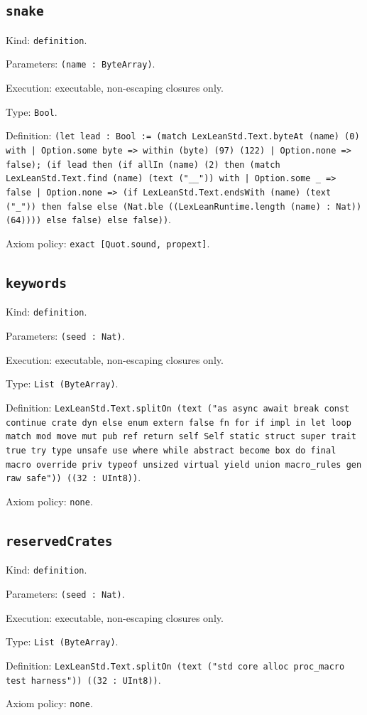 \documentclass[11pt]{article}
\begin{document}
\subsection*{\texttt{snake}}
\noindent Kind: \texttt{definition}.\par
\noindent Parameters: \texttt{(name : ByteArray)}.\par
\noindent Execution: executable, non-escaping closures only.\par
\noindent Type: \texttt{Bool}.\par
\noindent Definition: \texttt{(let lead : Bool := (match LexLeanStd.Text.byteAt (name) (0) with | Option.some byte => within (byte) (97) (122) | Option.none => false); (if lead then (if allIn (name) (2) then (match LexLeanStd.Text.find (name) (text ("\_\_")) with | Option.some \_ => false | Option.none => (if LexLeanStd.Text.endsWith (name) (text ("\_")) then false else (Nat.ble ((LexLeanRuntime.length (name) : Nat)) (64)))) else false) else false))}.\par
\noindent Axiom policy: \texttt{exact [Quot.sound, propext]}.\par
\subsection*{\texttt{keywords}}
\noindent Kind: \texttt{definition}.\par
\noindent Parameters: \texttt{(seed : Nat)}.\par
\noindent Execution: executable, non-escaping closures only.\par
\noindent Type: \texttt{List (ByteArray)}.\par
\noindent Definition: \texttt{LexLeanStd.Text.splitOn (text ("as async await break const continue crate dyn else enum extern false fn for if impl in let loop match mod move mut pub ref return self Self static struct super trait true try type unsafe use where while abstract become box do final macro override priv typeof unsized virtual yield union macro\_rules gen raw safe")) ((32 : UInt8))}.\par
\noindent Axiom policy: \texttt{none}.\par
\subsection*{\texttt{reservedCrates}}
\noindent Kind: \texttt{definition}.\par
\noindent Parameters: \texttt{(seed : Nat)}.\par
\noindent Execution: executable, non-escaping closures only.\par
\noindent Type: \texttt{List (ByteArray)}.\par
\noindent Definition: \texttt{LexLeanStd.Text.splitOn (text ("std core alloc proc\_macro test harness")) ((32 : UInt8))}.\par
\noindent Axiom policy: \texttt{none}.\par
\end{document}
